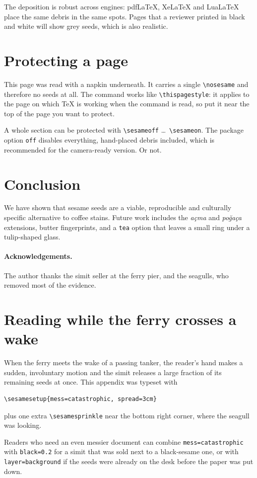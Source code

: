 \documentclass[11pt,a4paper]{article}
\begin{document}
The deposition is robust across engines: pdf\LaTeX, Xe\LaTeX{} and
Lua\LaTeX{} place the same debris in the same spots. Pages that a reviewer printed in
black and white will show grey seeds, which is also realistic.

\clearpage
\nosesame
\section{Protecting a page}
This page was read with a napkin underneath. It carries a single
\verb|\nosesame| and therefore no seeds at all. The command works like
\verb|\thispagestyle|: it applies to the page on which \TeX{} is working when
the command is read, so put it near the top of the page you want to protect.

A whole section can be protected with \verb|\sesameoff| \dots\ \verb|\sesameon|.
The package option \texttt{off} disables everything, hand-placed debris
included, which is recommended for the camera-ready version. Or not.

\section{Conclusion}

We have shown that sesame seeds are a viable, reproducible and culturally
specific alternative to coffee stains. Future work includes the
\emph{açma} and \emph{poğaça} extensions, butter fingerprints, and a
\texttt{tea} option that leaves a small ring under a tulip-shaped glass.

\paragraph{Acknowledgements.} The author thanks the simit seller at the
ferry pier, and the seagulls, who removed most of the evidence.

\clearpage
{}
\appendix
\section{Reading while the ferry crosses a wake}

\sesamesprinkle[count=30, spread=1.2cm]{15cm}{5cm}%
When the ferry meets the wake of a passing tanker, the reader's hand makes a
sudden, involuntary motion and the simit releases a large fraction of its
remaining seeds at once. This appendix was typeset with
\begin{verbatim}
\sesamesetup{mess=catastrophic, spread=3cm}
\end{verbatim}
plus one extra \verb|\sesamesprinkle| near the bottom right corner, where the
seagull was looking.

Readers who need an even messier document can combine
\texttt{mess=catastrophic} with \texttt{black=0.2} for a simit that was sold
next to a black-sesame one, or with \texttt{layer=background} if the seeds
were already on the desk before the paper was put down.
\end{document}
